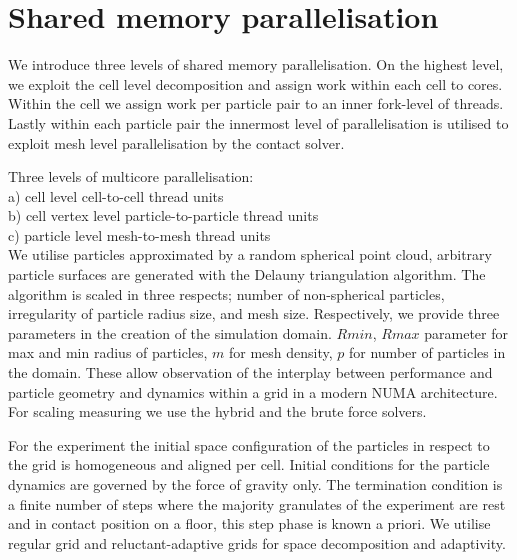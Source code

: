 \section{Shared memory parallelisation}
\label{section:shared-memory}

We introduce three levels of shared memory parallelisation. On the highest level, we exploit the cell level decomposition and assign work within each cell to cores. Within the cell we assign work per particle pair  to an inner fork-level of threads. Lastly within each particle pair the innermost level of parallelisation is utilised to exploit mesh level parallelisation by the contact solver.

Three levels of multicore parallelisation:\\

a) cell level cell-to-cell thread units\\

b) cell vertex level particle-to-particle thread units\\

c) particle level mesh-to-mesh thread units\\

We utilise particles approximated by a random spherical point cloud, arbitrary particle surfaces are generated with the Delauny triangulation algorithm. The algorithm is scaled in three respects; number of non-spherical particles, irregularity of particle radius size, and mesh size. Respectively, we provide three parameters in the creation of the simulation domain. $Rmin$, $Rmax$ parameter for max and min radius of particles, $m$ for mesh density, $p$ for number of particles in the domain. These allow observation of the interplay between performance and particle geometry and dynamics within a grid in a modern NUMA architecture. For scaling measuring we use the hybrid and the brute force solvers.

For the experiment the initial space configuration of the particles in respect to the grid is homogeneous and aligned per cell. Initial conditions for the particle dynamics are governed by the force of gravity only. The termination condition is a finite number of steps where the majority granulates of the experiment are rest and in contact position on a floor, this step phase is known a priori. We utilise regular grid and reluctant-adaptive grids for space decomposition and adaptivity. 

